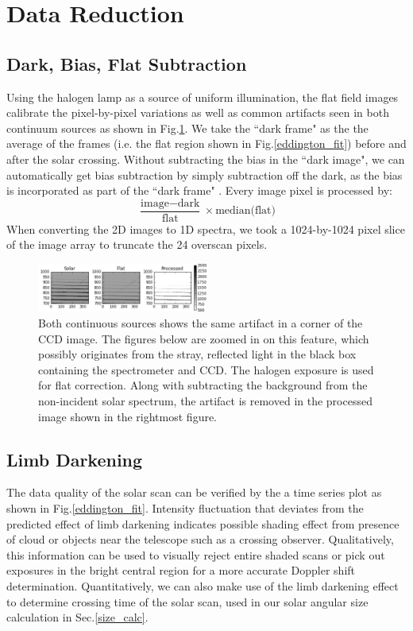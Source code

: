 \documentclass[authoryear, 12pt,5p, times]{elsarticle}
\begin{document}
\section{Data Reduction}
\label{data_reduction}
\subsection{Dark, Bias, Flat Subtraction}
\label{subtraction}
Using the halogen lamp as a source of uniform illumination, the flat field images calibrate the pixel-by-pixel variations as well as common artifacts seen in both continuum sources as shown in Fig.\ref{processed}. We take the ``dark frame" as the the average of the frames (i.e. the flat region shown in Fig.\ref{eddington_fit}) before and after the solar crossing. Without subtracting the bias in the ``dark image", we can automatically get bias subtraction by simply subtraction off the dark, as the bias is incorporated as part of the ``dark frame" .
Every image pixel is processed by:
\begin{equation}
			\frac{\text{image}-\text{dark}}{\text{flat}}\times\text{median(flat)}
			\label{calib_eq}
\end{equation}
 When converting the 2D images to 1D spectra, we took a 1024-by-1024 pixel slice of the image array to truncate the 24 overscan pixels.
 \begin{figure}[h!]
\includegraphics[width=0.5\textwidth]{figures/processed}
\caption{Both continuous sources shows the same artifact in a corner of the CCD image. The figures below are zoomed in on this feature, which  possibly originates from the stray, reflected light in the black box containing the spectrometer and CCD. The halogen exposure is used for flat correction. Along with subtracting the background from the non-incident solar spectrum, the artifact is removed in the processed image shown in the rightmost figure.}
\label{processed}
\end{figure}
\subsection{Limb Darkening}
The data quality of the solar scan can be verified by the a time series plot as shown in Fig.\ref{eddington_fit}. Intensity fluctuation that deviates from the predicted effect of limb darkening indicates possible shading effect from presence of cloud or objects near the telescope such as a crossing observer. Qualitatively, this information can be used to visually reject entire shaded scans or pick out exposures in the bright central region for a more accurate Doppler shift determination. Quantitatively, we can also make use of the limb darkening effect to determine crossing time of the solar scan, used in our solar angular size calculation in Sec.\ref{size_calc}.
\end{document}
